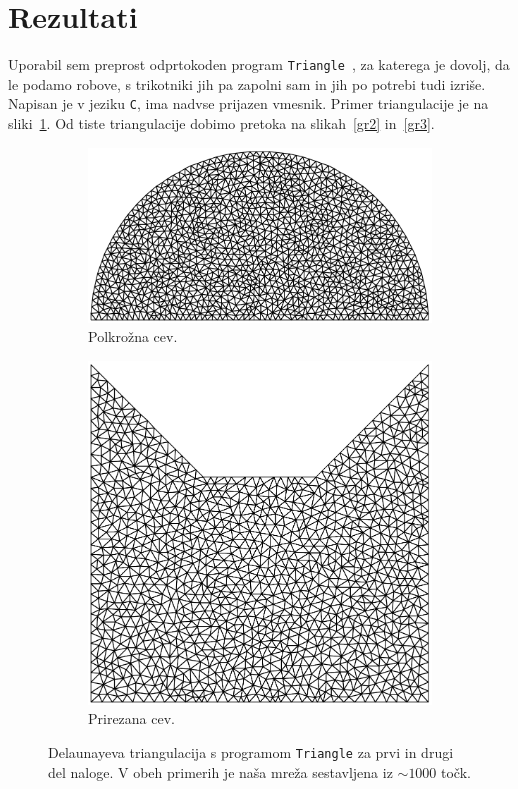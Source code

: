 \documentclass[a4 paper, 12pt]{article}
\begin{document}
\section{Rezultati}
Uporabil sem preprost odprtokoden program \texttt{Triangle}~\cite{triangle},
za katerega je dovolj, da le podamo robove, s trikotniki jih pa zapolni sam in jih po potrebi
tudi izri\v se. Napisan je v jeziku {\tt C}, ima nadvse prijazen vmesnik. Primer triangulacije
je na sliki~\ref{gr1}. Od tiste triangulacije dobimo pretoka na slikah~\ref{gr2} in~\ref{gr3}.
\begin{figure}[H]\centering
	\begin{subfigure}[b]{0.57\textwidth}
		\includegraphics[width=\textwidth, keepaspectratio=1]{semicircle.pdf}
		\caption{Polkro\v zna cev.}
	\end{subfigure}
	\begin{subfigure}[b]{0.40\textwidth}
		\includegraphics[width=\textwidth, keepaspectratio=1]{batman.pdf}
		\caption{Prirezana cev.}
	\end{subfigure}
	\caption{Delaunayeva triangulacija s programom \texttt{Triangle} za prvi in drugi del naloge.
		V obeh primerih je na\v sa mre\v za sestavljena iz $\sim 1000$ to\v ck.}
	\label{gr1}
\end{figure}
\end{document}
